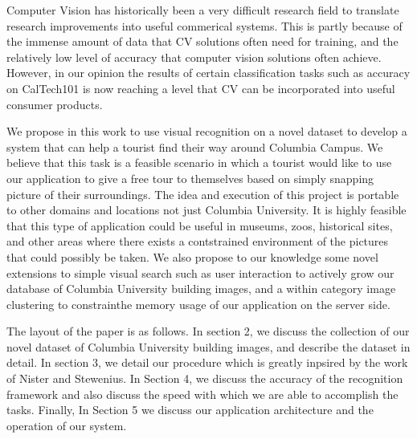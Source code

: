 Computer Vision has historically been a very difficult research field to translate research improvements into useful commerical systems.  
This is partly because of the immense amount of data that CV solutions often need for training, and the relatively low level of accuracy that computer vision solutions often achieve.
However, in our opinion the results of certain classification tasks such as accuracy on CalTech101\cite{fei-fei:caltech101} is now reaching a level that CV can be incorporated into useful consumer products.

We propose in this work to use visual recognition on a novel dataset to develop a system that can help a tourist find their way around Columbia Campus.
We believe that this task is a feasible scenario in which a tourist would like to use our application to give a free tour to themselves based on simply snapping picture of their surroundings.
The idea and execution of this project is portable to other domains and locations not just Columbia University.
It is highly feasible that this type of application could be useful in museums, zoos, historical sites, and other areas where there exists a contstrained environment of the pictures that could possibly be taken.
We also propose to our knowledge some novel extensions to simple visual search such as user interaction to actively grow our database of Columbia University building images, and a within category image clustering to constrainthe memory usage of our application on the server side.

The layout of the paper is as follows.
In section 2, we discuss the collection of our novel dataset of Columbia University building images, and describe the dataset in detail.
In section 3, we detail our procedure which is greatly inpsired by the work of Nister and Stewenius\cite{nister:vocabtree}.
In Section 4, we discuss the accuracy of the recognition framework and also discuss the speed with which we are able to accomplish the tasks.
Finally, In Section 5 we discuss our application architecture and the operation of our system.
